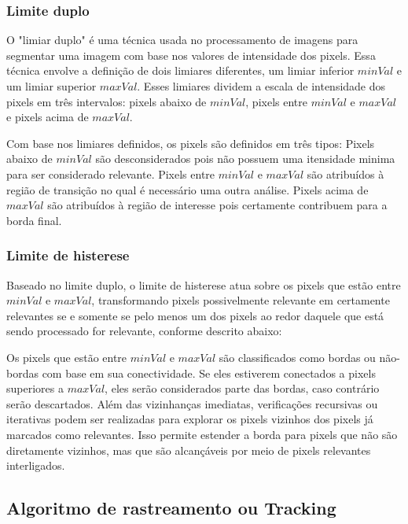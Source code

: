 \subsubsection[Limite duplo]{Limite duplo}

O "limiar duplo" é uma técnica usada no processamento de imagens para segmentar uma imagem com base nos valores de intensidade dos pixels. Essa técnica envolve a definição de dois limiares diferentes, um limiar inferior $minVal$ e um limiar superior $maxVal$. Esses limiares dividem a escala de intensidade dos pixels em três intervalos: pixels abaixo de $minVal$, pixels entre $minVal$ e $maxVal$ e pixels acima de $maxVal$.

Com base nos limiares definidos, os pixels são definidos em três tipos:
Pixels abaixo de $minVal$ são desconsiderados pois não possuem uma itensidade minima para ser considerado relevante.
Pixels entre $minVal$ e  $maxVal$ são atribuídos à região de transição no qual é necessário uma outra análise.
Pixels acima de  $maxVal$ são atribuídos à região de interesse pois certamente contribuem para a borda final.\cite{canny-edge-detection-python}


\subsubsection[Limite de histerese]{Limite de histerese}

Baseado no limite duplo, o limite de histerese atua sobre os pixels que estão entre $minVal$ e $maxVal$,  transformando pixels possivelmente relevante em certamente relevantes se e somente se pelo menos um dos pixels ao redor daquele que está sendo processado for relevante, conforme descrito abaixo:


Os pixels que estão entre $minVal$ e  $maxVal$  são classificados como bordas ou não-bordas com base em sua conectividade. Se eles estiverem conectados a pixels  superiores a  $maxVal$, eles serão considerados parte das bordas, caso contrário serão descartados. Além das vizinhanças imediatas, verificações recursivas ou iterativas podem ser realizadas para explorar os pixels vizinhos dos pixels já marcados como relevantes. Isso permite estender a borda para pixels que não são diretamente vizinhos, mas que são alcançáveis por meio de pixels relevantes interligados.\cite{opencv-canny}






\subsection[Algoritmo de rastreamento ou Tracking]{Algoritmo de rastreamento ou Tracking}

